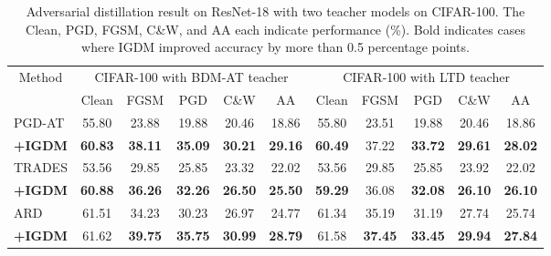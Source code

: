 \documentclass{article} %
\begin{document}
\begin{table}[h]
 \centering
 \caption{Adversarial distillation result on ResNet-18 with two teacher models on CIFAR-100. The Clean, PGD, FGSM, C\&W, and AA each indicate performance (\%). Bold indicates cases where IGDM improved accuracy by more than 0.5 percentage points.}
 \setlength{\tabcolsep}{5.5pt}
 \begin{tabular}{lcccccccccc}
 \toprule
    \multicolumn{1}{c}{\multirow{2.5}{*}{Method}}  & \multicolumn{5}{c}{ CIFAR-100 with BDM-AT teacher}& \multicolumn{5}{c}{CIFAR-100 with LTD teacher} \\
   \cmidrule(r){2-6}
   \cmidrule(r){7-11}
   & Clean & FGSM & PGD & C\&W & AA & Clean & FGSM & PGD & C\&W & AA \\
\midrule

 PGD-AT  & 55.80 & 23.88 & 19.88 & 20.46 & 18.86 & 55.80 & 23.51 & 19.88 & 20.46 & 18.86  \\
 \textbf{+IGDM} & \textbf{60.83} & \textbf{38.11} & \textbf{35.09} & \textbf{30.21}& \textbf{29.16}& \textbf{60.49} & 37.22 & \textbf{33.72} & \textbf{29.61} & \textbf{28.02} \\
 \midrule
 TRADES & 53.56 & 29.85 & 25.85 & 23.32 & 22.02 & 53.56 & 29.85 & 25.85 & 23.92 & 22.02 \\
 \textbf{+IGDM}  & \textbf{60.88} & \textbf{36.26} & \textbf{32.26} & \textbf{26.50} & \textbf{25.50} & \textbf{59.29} & 36.08 & \textbf{32.08} & \textbf{26.10} & \textbf{26.10} \\
 \midrule
 ARD & 61.51 & 34.23 & 30.23 & 26.97 & 24.77& 61.34 & 35.19 & 31.19 & 27.74 & 25.74\\
 \textbf{+IGDM} & 61.62 & \textbf{39.75} & \textbf{35.75} & \textbf{30.99} & \textbf{28.79} & 61.58 & \textbf{37.45} & \textbf{33.45} & \textbf{29.94} & \textbf{27.84}\\
 \midrule


\end{tabular}
\end{table}
\end{document}
